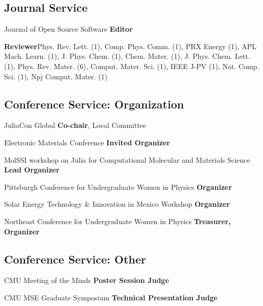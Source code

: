 \subsection{Journal Service}

{Journal of Open Source Software}
{\textbf{Editor}}
{}

{}
                     {\textbf{Reviewer}}{Phys. Rev. Lett. (1), Comp. Phys. Comm. (1), PRX Energy (1), APL Mach. Learn. (1), J. Phys. Chem. (1), Chem. Mater. (1), J. Phys. Chem. Lett. (1), Phys. Rev.  Mater. (6), Comput. Mater. Sci. (1), IEEE J-PV (1), Nat. Comp. Sci. (1), Npj Comput. Mater. (1)}

\vspace{-2mm}
\subsection{Conference Service: Organization}
                      {JuliaCon Global}
                      {\textbf{Co-chair}, Local Committee}
                        {}

{Electronic Materials Conference}
{\textbf{Invited Organizer}}
{}

{MolSSI workshop on Julia for Computational Molecular and Materials Science}
{\textbf{Lead Organizer}}
{}

{Pittsburgh Conference for Undergraduate Women in Physics}
{\textbf{Organizer}}
{}

{Solar Energy Technology \& Innovation in Mexico Workshop}
{\textbf{Organizer}}
{}

{Northeast Conference for Undergraduate Women in Physics}
{\textbf{Treasurer, Organizer}}
{}

\vspace{-2mm}
\subsection{Conference Service: Other}

{CMU Meeting of the Minds}
{\textbf{Poster Session Judge}}
{}


{CMU MSE Graduate Symposium}
{\textbf{Technical Presentation Judge}}
{}

